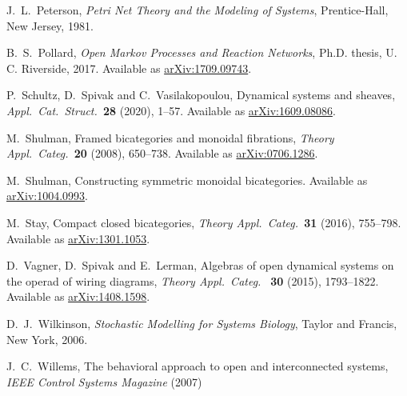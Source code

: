 \documentclass[reqno]{amsart}
\begin{document}
\begin{thebibliography}{100}

 J.\ L.\ Peterson, \textit{Petri Net Theory and the Modeling of Systems}, Prentice-Hall, New Jersey, 1981.  

 B.\ S.\ Pollard, \textsl{Open Markov Processes and Reaction Networks}, Ph.D. thesis, U. C. Riverside, 2017.  Available as \href{https://arxiv.org/abs/1709.09743}{arXiv:1709.09743}.



 P.\ Schultz, D.\ Spivak and C.\ Vasilakopoulou, Dynamical systems and sheaves, \textsl{Appl.\ Cat.\ Struct.\ }\textbf{28} (2020), 1--57. Available as \href{https://arxiv.org/abs/1609.08086}{arXiv:1609.08086}.

 M.\ Shulman, Framed bicategories and monoidal fibrations, \textsl{Theory Appl.\ Categ.\ }\textbf{20} (2008), 650--738. Available as \href{https://arxiv.org/abs/0706.1286}{arXiv:0706.1286}.

 M.\ Shulman, Constructing symmetric monoidal bicategories. Available as \href{http://arxiv.org/abs/1004.0993}{arXiv:1004.0993}.

 M.\ Stay, Compact closed bicategories, \textsl{Theory Appl.\ Categ.\ }\textbf{31} (2016), 755--798.   Available as \href{http://arxiv.org/abs/1301.1053}{arXiv:1301.1053}.

 D.\ Vagner, D.\ Spivak and E.\ Lerman, Algebras of open dynamical systems on the operad of wiring diagrams, \textsl{Theory Appl.\ Categ.\ } \textbf{30} (2015), 1793--1822. Available as \href{https://arxiv.org/abs/1408.1598}{arXiv:1408.1598}.

 D.\ J.\ Wilkinson, \textsl{Stochastic Modelling for Systems Biology},
Taylor and Francis, New York, 2006.

 J.\ C.\ Willems, The behavioral approach to open and interconnected systems, \textsl{IEEE Control Systems Magazine} (2007)

\end{thebibliography}
\end{document}
